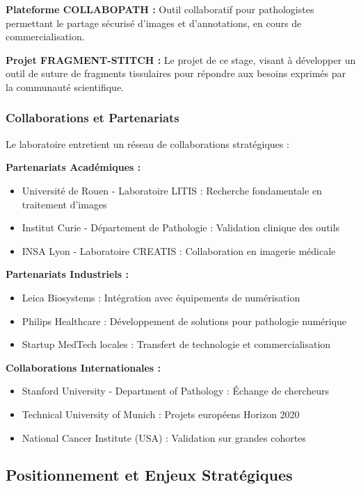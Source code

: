 \documentclass[12pt,a4paper]{article}
\begin{document}
\textbf{Plateforme COLLABOPATH :} Outil collaboratif pour pathologistes permettant le partage sécurisé d'images et d'annotations, en cours de commercialisation.

\textbf{Projet FRAGMENT-STITCH :} Le projet de ce stage, visant à développer un outil de suture de fragments tissulaires pour répondre aux besoins exprimés par la communauté scientifique.

\subsubsection{Collaborations et Partenariats}

Le laboratoire entretient un réseau de collaborations stratégiques :

\textbf{Partenariats Académiques :}
\begin{itemize}
\item Université de Rouen - Laboratoire LITIS : Recherche fondamentale en traitement d'images
\item Institut Curie - Département de Pathologie : Validation clinique des outils
\item INSA Lyon - Laboratoire CREATIS : Collaboration en imagerie médicale
\end{itemize}

\textbf{Partenariats Industriels :}
\begin{itemize}
\item Leica Biosystems : Intégration avec équipements de numérisation
\item Philips Healthcare : Développement de solutions pour pathologie numérique
\item Startup MedTech locales : Transfert de technologie et commercialisation
\end{itemize}

\textbf{Collaborations Internationales :}
\begin{itemize}
\item Stanford University - Department of Pathology : Échange de chercheurs
\item Technical University of Munich : Projets européens Horizon 2020
\item National Cancer Institute (USA) : Validation sur grandes cohortes
\end{itemize}

\subsection{Positionnement et Enjeux Stratégiques}
\end{document}
